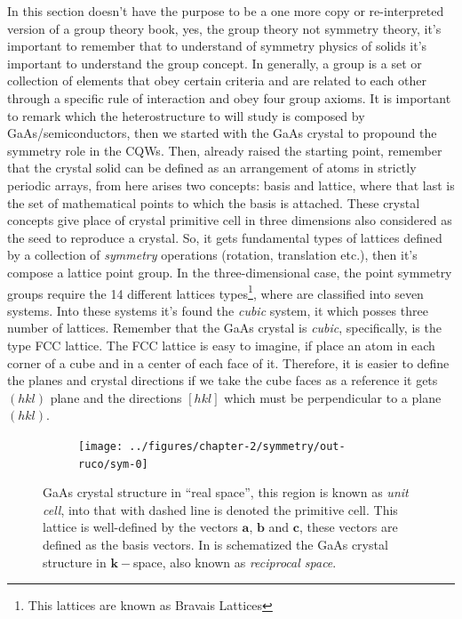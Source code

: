 In this section doesn't have the purpose to be a one more copy or re-interpreted version of a group theory book, yes,  the group theory not symmetry theory, it's important to remember that to understand of symmetry physics of solids it's important to understand the group concept. 
In generally, a group is a set or collection of elements that obey certain criteria and are related to each other through a specific rule of interaction and obey four group axioms\cite{powell2010symmetry,cornwell1997group,muller2013symmetry}. 
It is important to remark which the heterostructure to will study is composed by GaAs/\algaas semiconductors, then  we started with the GaAs crystal to propound the symmetry role in the  CQWs.  Then, already raised the starting point,  remember that the crystal solid  can be defined as an  arrangement of atoms in strictly periodic arrays\cite{kittel2018kittel,solyom2007fundamentals}, from here arises two concepts: basis and lattice, where that last is the set of mathematical points to which the basis is attached\cite{kittel2018kittel}. These crystal concepts give place of crystal primitive cell in three dimensions also considered as the seed to reproduce a crystal. So, it gets  fundamental types of lattices defined  by a collection of \emph{symmetry} operations (rotation, translation etc.), then it's compose a lattice point group. In the three-dimensional case, the point symmetry groups require the 14 different lattices types\footnote{This lattices are known as Bravais Lattices}, where are classified into seven systems. Into these systems it's found the \emph{cubic} system, it which posses three number of lattices. Remember that the GaAs crystal is \emph{cubic},  specifically, is the type FCC lattice.  The FCC lattice is easy to imagine, if place an atom in each corner of  a cube and in a center of each face of it. Therefore, it is easier  to define  the planes and crystal directions if we take the cube faces as a reference it gets $(hkl)$ plane and the directions $\left[hkl\right]$ which must be perpendicular to a plane $(hkl)$\cite{kittel2018kittel}. 
\begin{figure}[h!]
	\centering
	\begin{subfigure}{\textwidth}
		\texttt{[image: ../figures/chapter-2/symmetry/out-ruco/sym-0]}
		\label{subfig:subsubsection-2.1-crystal-rspace-a)}
		\label{subfig:subsubsection-2.1-crystal-kspace-b)}
	\end{subfigure}
	\caption{ GaAs crystal structure in ``real space'',  this region is known as \emph{unit cell}, into that with dashed line is denoted the primitive cell. This lattice is well-defined by the vectors $\mathbf{a}$, $\mathbf{b}$ and $\mathbf{c}$, these vectors are defined as the basis vectors.  In  is schematized the GaAs crystal structure in $\boldsymbol{k}-$space, also known as \emph{reciprocal space}.}
	\label{fig:subsubsection-2.1-crystal-r-k-space}
\end{figure}

